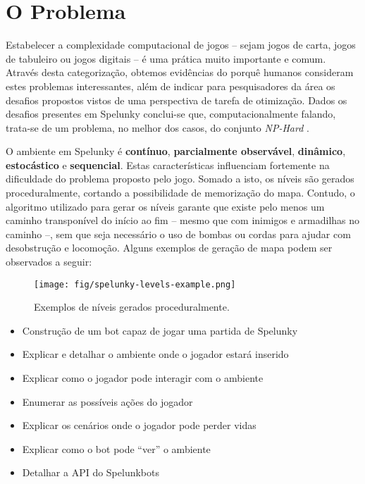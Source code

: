 \chapter{\label{chap:problem}O Problema}
Estabelecer a complexidade computacional de jogos -- sejam jogos de carta,
jogos de tabuleiro ou jogos digitais -- é uma prática muito importante e comum.
Através desta categorização, obtemos evidências do porquê humanos consideram
estes problemas interessantes, além de indicar para pesquisadores da área os
desafios propostos vistos de uma perspectiva de tarefa de otimização.  Dados os
desafios presentes em Spelunky conclui-se que, computacionalmente falando,
trata-se de um problema, no melhor dos casos, do conjunto \textit{NP-Hard}
\cite{SPELUNKYHARD}.

O ambiente em Spelunky é \textbf{contínuo}, \textbf{parcialmente observável},
\textbf{dinâmico}, \textbf{estocástico} e \textbf{sequencial}. Estas
características influenciam fortemente na dificuldade do problema proposto pelo
jogo. Somado a isto, os níveis são gerados proceduralmente, cortando a
possibilidade de memorização do mapa. Contudo, o algoritmo utilizado para gerar
os níveis garante que existe pelo menos um caminho transponível do início ao fim
-- mesmo que com inimigos e armadilhas no caminho --, sem que seja necessário o
uso de bombas ou cordas para ajudar com desobstrução e locomoção. Alguns
exemplos de geração de mapa podem ser observados a seguir:

\begin{figure}[htb!]
\centering\texttt{[image: fig/spelunky-levels-example.png]}
\caption {\label{fig:spelunkbots-debug-screen}Exemplos de níveis gerados
proceduralmente.} \end{figure}


\begin{itemize}
    \item Construção de um bot capaz de jogar uma partida de Spelunky
    \item Explicar e detalhar o ambiente onde o jogador estará inserido
    \item Explicar como o jogador pode interagir com o ambiente
    \item Enumerar as possíveis ações do jogador
    \item Explicar os cenários onde o jogador pode perder vidas
    \item Explicar como o bot pode ``ver'' o ambiente
    \item Detalhar a API do Spelunkbots
\end{itemize}
